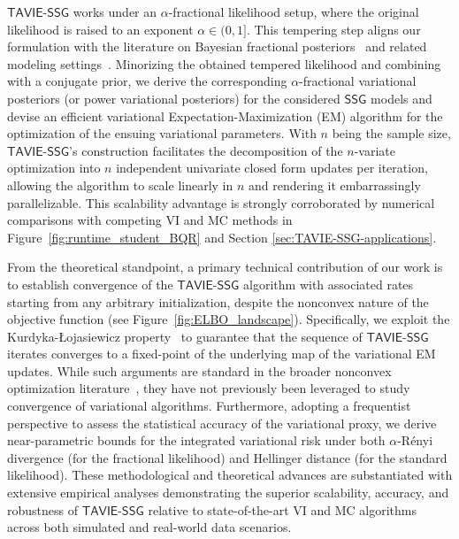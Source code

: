 \documentclass[12pt]{article}
\numberwithin{equation}{section}
\newcommand{\ssg}{\mathsf{SSG}}
\newcommand{\tssg}{\mathsf{TAVIE}\text{-}\mathsf{SSG}}
\begin{document}
$\tssg$ works under an $\alpha$-fractional likelihood setup, where the original likelihood is raised to an exponent $\alpha \in (0,1]$. This tempering step aligns our formulation with the literature on Bayesian fractional posteriors~\citep{FrielPettitt2008,Bayesian-fractional-posterior} and related modeling settings~\citep{chernozhukov2003mcmc,jiang2008gibbs}. Minorizing the obtained tempered likelihood and combining with a conjugate prior, we derive the corresponding $\alpha$-fractional variational posteriors (or power variational posteriors) for the considered $\ssg$ models and devise an efficient variational Expectation-Maximization (EM) algorithm for the optimization of the ensuing variational parameters. With $n$ being the sample size, $\tssg$'s construction facilitates the decomposition of the $n$-variate optimization into $n$ independent univariate closed form updates per iteration, allowing the algorithm to scale linearly in $n$ and rendering it embarrassingly parallelizable. This scalability advantage is strongly corroborated by numerical comparisons with competing VI and MC methods in Figure~\ref{fig:runtime_student_BQR} and Section \ref{sec:TAVIE-SSG-applications}.

From the theoretical standpoint, a primary technical contribution of our work is to establish convergence of the $\tssg$ algorithm with associated rates starting from any arbitrary initialization, despite the nonconvex nature of the objective function (see Figure~\ref{fig:ELBO_landscape}). Specifically, we exploit the Kurdyka-\L ojasiewicz property~\citep{lojasiewicz1963propriete,kurdyka1998gradients} to guarantee that the sequence of $\tssg$ iterates converges to a fixed-point of the underlying map of the variational EM updates. While such arguments are standard in the broader nonconvex optimization literature~\citep{attouch2010proximal,bolte2014proximal}, they have not previously been leveraged to study convergence of variational algorithms. Furthermore, adopting a frequentist perspective to assess the statistical accuracy of the variational proxy, we derive near-parametric bounds for the integrated variational risk under both $\alpha$-R\'{e}nyi divergence (for the fractional likelihood) and Hellinger distance (for the standard likelihood). These methodological and theoretical advances are substantiated with extensive empirical analyses demonstrating the superior scalability, accuracy, and robustness of $\tssg$ relative to state-of-the-art VI and MC algorithms across both simulated and real-world data scenarios.
\end{document}
